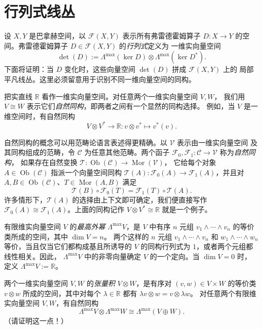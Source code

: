 
\section{行列式线丛}\label{sec:A-2}

设 $X,Y$ 是巴拿赫空间，以 $\mathcal F(X,Y)$ 表示所有弗雷德霍姆算子
$D:X\to Y$ 的空间。弗雷德霍姆算子 $D\in\mathcal F(X,Y)$ 的\emph{行列式}定义为
一维实向量空间
\[
  \det(D):=\Lambda^{\max}(\ker D)\otimes\Lambda^{\max}(\ker D^*).
\]
下面将证明：当 $D$ 变化时，这些向量空间 $\det(D)$ 拼成 $\mathcal F(X,Y)$ 上的
局部平凡线丛。这里必须留意用于识别不同一维向量空间的同构。

把实直线 $\mathbb R$ 看作一维实向量空间。对任意两个一维实向量空间 $V,W$，
我们用 $V\cong W$ 表示它们\emph{自然同构}，即两者之间有一个显然的同构选择。
例如，当 $V$ 是一维空间时，有自然同构
\[
  V\otimes V^*\longrightarrow\mathbb R:
  v\otimes v^*\longmapsto v^*(v).
\]

自然同构的概念可以用范畴论语言表述得更精确。以 $\mathcal V$ 表示由一维实向量空间
及其同构组成的范畴，令 $\mathcal C$ 为任意其他范畴。两个函子
$\mathcal F_0,\mathcal F_1:\mathcal C\to\mathcal V$ 称为\emph{自然同构}，
如果存在自然变换
$\mathcal T:\operatorname{Ob}(\mathcal C)\to\operatorname{Mor}(\mathcal V)$，
它给每个对象 $A\in\operatorname{Ob}(\mathcal C)$ 指派一个向量空间同构
$\mathcal T(A):\mathcal F_0(A)\to\mathcal F_1(A)$，并且对
$A,B\in\operatorname{Ob}(\mathcal C)$、$T\in\operatorname{Mor}(A,B)$ 满足
\[
  \mathcal T(B)\circ\mathcal F_0(T)
  =\mathcal F_1(T)\circ\mathcal T(A).
\]
许多情形下，$\mathcal T(A)$ 的选择由上下文即可确定，我们便直接写作
$\mathcal F_0(A)\cong\mathcal F_1(A)$。上面的同构记作
$V\otimes V^*\cong\mathbb R$ 就是一个例子。

有限维实向量空间 $V$ 的\emph{最高外幂} $\Lambda^{\max}V$，是 $V$ 中有序
$n$ 元组 $v_1\wedge\cdots\wedge v_n$ 的等价类所成的空间，其中 $\dim V=n$。
两个这样的 $n$ 元组 $v_1\wedge\cdots\wedge v_n$ 和
$w_1\wedge\cdots\wedge w_n$ 等价，当且仅当它们都构成基且所诱导的
$V$ 的同构行列式为 $1$，或者两个元组都线性相关。因此，
$\Lambda^{\max}V$ 中的非零向量确定 $V$ 的一个定向。当 $\dim V=0$ 时，
定义 $\Lambda^{\max}V:=\mathbb R$。

两个一维实向量空间 $V,W$ 的\emph{张量积} $V\otimes W$，是有序对
$(v,w)\in V\times W$ 的等价类 $v\otimes w$ 所成的空间，其中对每个
$\lambda\in\mathbb R$ 都有 $\lambda v\otimes w=v\otimes\lambda w$。
对任意两个有限维实向量空间 $V,W$，有自然同构
\[
  \Lambda^{\max}V\otimes\Lambda^{\max}W
  \cong\Lambda^{\max}(V\oplus W).
\]
（请证明这一点！）

